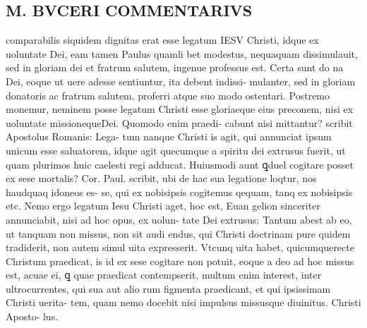 \documentclass{article}
\begin{document}
\begin{pages}
\section*{M. BVCERI COMMENTARIVS }
\marginpar{[ p.18 ]}\pstart comparabilis siquidem dignitas erat esse legatum IESV Christi, idque ex uoluntate Dei, eam tamen Paulus quamli bet modestus, nequaquam dissimulauit, sed in gloriam dei et fratrum salutem, ingenue professus est. Certa sunt do na Dei, eoque ut uere adesse sentiuntur, ita debent indissi- mulanter, sed in gloriam donatoris ac fratrum salutem, proferri atque suo modo ostentari.  Postremo monemur, neminem posse legatum Christi esse gloriaeque eius preconem, nisi ex uoluntate missionequeDei.  Quomodo enim praedi- cabunt nisi mittantur? scribit Apostolus Romanis: Lega- tum nanque Christi is agit, qui annunciat ipsum unicum esse saluatorem, idque agit quecumque a spiritu dei extrusus fuerit, ut quam plurimos huic caelesti regi adducat.  Huiusmodi aunt ꝗduel cogitare posset ex sese mortalis? Cor. Paul.  scribit, ubi de hac sua legatione loqtur, nos haudquaq idoneos es- se, qui ex nobisipsis cogitemus qequam, tanq ex nobisipsis etc.  Nemo ergo legatum Iesu Christi aget, hoc est, Euan gelion sinceriter annunciabit, nisi ad hoc opus, ex uolun- tate Dei extrusus:  \pend\pstart Tantum abest ab eo, ut tanquam non missus, non sit audi endus, qui Christi doctrinam pure quidem tradiderit, non autem simul uita expresserit. Vtcunq uita habet, quicumquerecte Christum praedicat, is id ex sese cogitare non potuit, eoque a deo ad hoc missus est, acuae ei, ꝗ quae praedicat contempserit, multum enim interest, inter ultrocurrentes, qui sua aut alio rum figmenta praedicant, et qui ipsissimam Christi uerita- tem, quam nemo docebit nisi impulsus missusque diuinitus.   \pendQuis Christi Aposto- lus.  

\end{pages}
\end{document}
